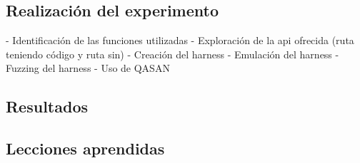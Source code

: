 \subsection{Realización del experimento}
- Identificación de las funciones utilizadas
- Exploración de la api ofrecida (ruta teniendo código y ruta sin)
- Creación del harness
- Emulación del harness
- Fuzzing del harness
- Uso de QASAN

\subsection{Resultados}
\subsection{Lecciones aprendidas}



